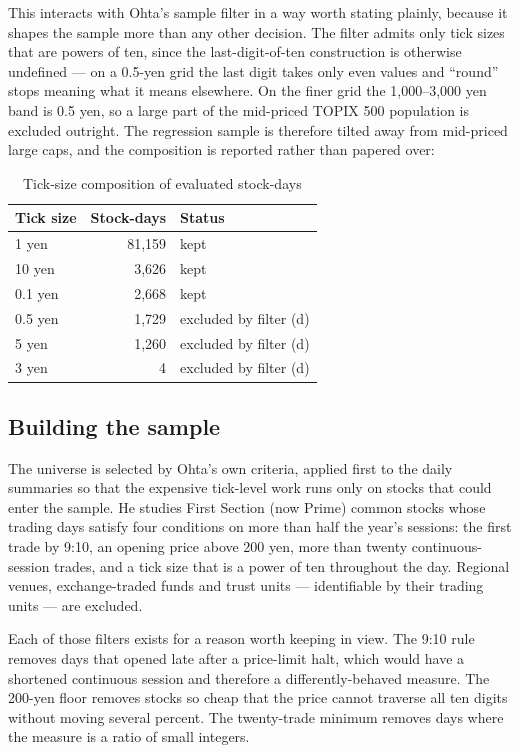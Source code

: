 This interacts with Ohta's sample filter in a way worth stating plainly, because
it shapes the sample more than any other decision. The filter admits only tick
sizes that are powers of ten, since the last-digit-of-ten construction is
otherwise undefined --- on a 0.5-yen grid the last digit takes only even values
and ``round'' stops meaning what it means elsewhere. On the finer grid the
1,000--3,000 yen band is 0.5 yen, so a large part of the mid-priced TOPIX 500
population is excluded outright. The regression sample is therefore tilted away
from mid-priced large caps, and the composition is reported rather than papered
over:

\begin{table}[htbp]
\centering
\caption{Tick-size composition of evaluated stock-days}
\label{tab:tickcomp}
\small
\begin{tabular}{@{}lrl@{}}
\toprule
Tick size & Stock-days & Status \\
\midrule
1 yen & 81,159 & kept \\
10 yen & 3,626 & kept \\
0.1 yen & 2,668 & kept \\
0.5 yen & 1,729 & excluded by filter (d) \\
5 yen & 1,260 & excluded by filter (d) \\
3 yen & 4 & excluded by filter (d) \\
\bottomrule
\end{tabular}
\end{table}

\subsection{Building the sample}

The universe is selected by Ohta's own criteria, applied first to the daily
summaries so that the expensive tick-level work runs only on stocks that could
enter the sample. He studies First Section (now Prime) common stocks whose
trading days satisfy four conditions on more than half the year's sessions: the
first trade by 9:10, an opening price above 200 yen, more than twenty
continuous-session trades, and a tick size that is a power of ten throughout the
day. Regional venues, exchange-traded funds and trust units --- identifiable by
their trading units --- are excluded.

Each of those filters exists for a reason worth keeping in view. The 9:10 rule
removes days that opened late after a price-limit halt, which would have a
shortened continuous session and therefore a differently-behaved measure. The
200-yen floor removes stocks so cheap that the price cannot traverse all ten
digits without moving several percent. The twenty-trade minimum removes days
where the measure is a ratio of small integers.

